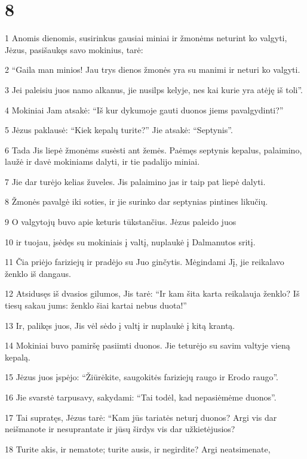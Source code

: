 \chapter{8}


\par 1 Anomis dienomis, susirinkus gausiai miniai ir žmonėms neturint ko valgyti, Jėzus, pasišaukęs savo mokinius, tarė: 
\par 2 “Gaila man minios! Jau trys dienos žmonės yra su manimi ir neturi ko valgyti. 
\par 3 Jei paleisiu juos namo alkanus, jie nusilps kelyje, nes kai kurie yra atėję iš toli”. 
\par 4 Mokiniai Jam atsakė: “Iš kur dykumoje gauti duonos jiems pavalgydinti?” 
\par 5 Jėzus paklausė: “Kiek kepalų turite?” Jie atsakė: “Septynis”. 
\par 6 Tada Jis liepė žmonėms susėsti ant žemės. Paėmęs septynis kepalus, palaimino, laužė ir davė mokiniams dalyti, ir tie padalijo miniai. 
\par 7 Jie dar turėjo kelias žuveles. Jis palaimino jas ir taip pat liepė dalyti. 
\par 8 Žmonės pavalgė iki soties, ir jie surinko dar septynias pintines likučių. 
\par 9 O valgytojų buvo apie keturis tūkstančius. Jėzus paleido juos 
\par 10 ir tuojau, įsėdęs su mokiniais į valtį, nuplaukė į Dalmanutos sritį. 
\par 11 Čia priėjo fariziejų ir pradėjo su Juo ginčytis. Mėgindami Jį, jie reikalavo ženklo iš dangaus. 
\par 12 Atsidusęs iš dvasios gilumos, Jis tarė: “Ir kam šita karta reikalauja ženklo? Iš tiesų sakau jums: ženklo šiai kartai nebus duota!” 
\par 13 Ir, palikęs juos, Jis vėl sėdo į valtį ir nuplaukė į kitą krantą. 
\par 14 Mokiniai buvo pamiršę pasiimti duonos. Jie teturėjo su savim valtyje vieną kepalą. 
\par 15 Jėzus juos įspėjo: “Žiūrėkite, saugokitės fariziejų raugo ir Erodo raugo”. 
\par 16 Jie svarstė tarpusavy, sakydami: “Tai todėl, kad nepasiėmėme duonos”. 
\par 17 Tai supratęs, Jėzus tarė: “Kam jūs tariatės neturį duonos? Argi vis dar neišmanote ir nesuprantate ir jūsų širdys vis dar užkietėjusios? 
\par 18 Turite akis, ir nematote; turite ausis, ir negirdite? Argi neatsimenate, 
